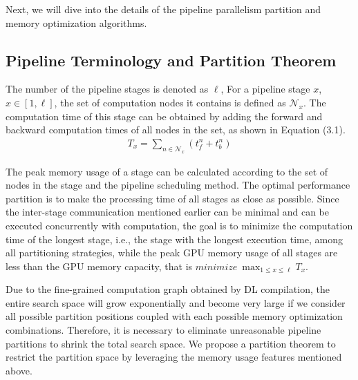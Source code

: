 
Next, we will dive into the details of the pipeline parallelism partition and memory optimization algorithms.

\subsection{Pipeline Terminology and Partition Theorem}
The number of the pipeline stages is denoted as $\ell$,
For a pipeline stage $x$, $x \in [1, \ell]$,
the set of computation nodes it contains is defined as $\mathcal{N}_x$.
The computation time of this stage can be obtained
by adding the forward and backward computation times
of all nodes in the set, as shown in Equation (3.1).
\begin{align}
  T_x=\sum_{n \in \mathcal{N}_x}\left(t_f^n+t_b^n\right)
\end{align}

The peak memory usage of a stage can be calculated according
to the set of nodes in the stage and the pipeline scheduling method.
The optimal performance partition is to make the
processing time of all stages as close as possible.
Since the inter-stage communication mentioned earlier
can be minimal and can be executed concurrently with computation,
the goal is to minimize the computation time of the longest stage,
i.e., the stage with the longest execution time, among all partitioning strategies,
while the peak GPU memory usage of all stages are less than the GPU memory capacity,
that is $minimize\ \max_{1 \leq x \leq \ell} T_x$.

Due to the fine-grained computation graph obtained by DL compilation,
the entire search space will grow exponentially and become very large
if we consider all possible partition positions coupled with each
possible memory optimization combinations.
Therefore, it is necessary to eliminate unreasonable
pipeline partitions to shrink the total search space.
We propose a partition theorem to restrict the partition space
by leveraging the memory usage features mentioned above.

